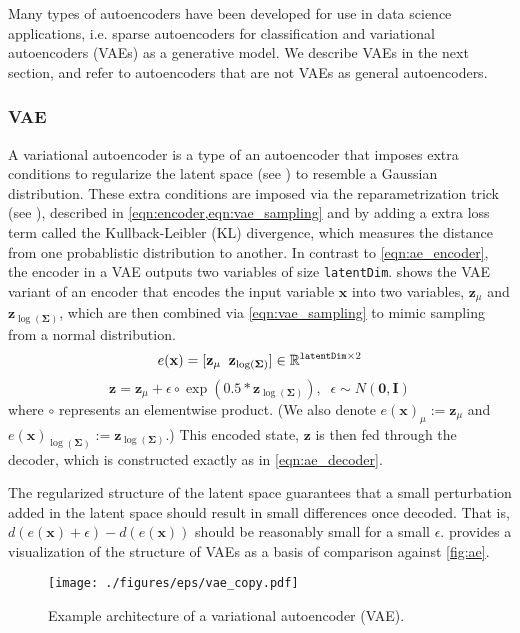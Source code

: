 \documentclass[final,3p]{elsarticle}
\theoremstyle{break}
\newcommand{\R}{\mathbb{R}}
\newcommand{\eps}{\epsilon}
\newcommand{\bb}[1]{\mathbf{#1}}
\begin{document}
Many types of autoencoders have been developed for use in data science applications, i.e. sparse autoencoders for classification and variational autoencoders (VAEs) as a generative model.
We describe VAEs in the next section, and refer to autoencoders that are not VAEs as general autoencoders. 

\subsubsection{VAE}\label{methods:VAE}
A variational autoencoder is a type of an autoencoder that imposes extra conditions to regularize the latent space (see \cite{Kingma2014,Kingma2019}) to resemble a Gaussian distribution.
These extra conditions are imposed via the reparametrization trick (see \cite{Kingma2014}), described in \cref{eqn:encoder,eqn:vae_sampling} and by adding a extra loss term called the Kullback-Leibler (KL) divergence, which measures the distance from one probablistic distribution to another. 
In contrast to \cref{eqn:ae_encoder}, the encoder in a VAE outputs two variables of size {\tt latentDim}.
 shows the VAE variant of an encoder that encodes the input variable $\bb{x}$ into two variables, $\bb{z}_{\mu}$ and $\bb{z}_{\log(\bb{\Sigma})}$, which are then combined via \cref{eqn:vae_sampling} to mimic sampling from a normal distribution.
\begin{equation}
e(\bb{x})=[\bb{z}_{\mu}\;\; \bb{z}_{\log(\bb{\Sigma})}] \in \R^{{\tt latentDim} \times 2}
\label{eqn:encoder}
\end{equation}
\begin{equation}\label{eqn:vae_sampling}
\bb{z} = \bb{z}_{\mu} + \eps\circ\exp{(0.5 * \bb{z}_{\log(\bb{\Sigma})})},\;\; \eps \sim N(\bb{0},\bb{I})
\end{equation}
where $\circ$ represents an elementwise product.
(We also denote $e(\bb{x})_{\mu}:=\bb{z}_{\mu}$ and  $e(\bb{x})_{\log(\bb{\Sigma})}:=\bb{z}_{\log(\bb{\Sigma})}$.)
This encoded state, $\bb{z}$ is then fed through the decoder, which is constructed exactly as in \cref{eqn:ae_decoder}.

The regularized structure of the latent space guarantees that a small perturbation added in the latent space should result in small differences once decoded. 
That is, $d(e(\bb{x})+\eps)-d(e(\bb{x}))$ should be reasonably small for a small $\eps$.
 provides a visualization of the structure of VAEs as a basis of comparison against \cref{fig:ae}. 
\begin{figure}[h]
 	\centering
 	\vspace{-10pt}
 	\texttt{[image: ./figures/eps/vae\_copy.pdf]}
 	\vspace{-10pt}
 	\caption{\label{fig:vae} Example architecture of a variational autoencoder (VAE).}
\end{figure}
\end{document}
